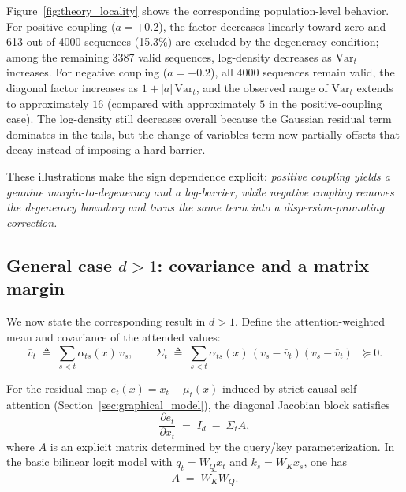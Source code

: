 \documentclass[11pt]{article}
\begin{document}
Figure~\ref{fig:theory_locality} shows the corresponding population-level behavior.
For positive coupling ($a=+0.2$), the factor decreases linearly toward zero and
613 out of 4000 sequences (15.3\%) are excluded by the degeneracy condition; among the remaining
3387 valid sequences, log-density decreases as $\mathrm{Var}_t$ increases.
For negative coupling ($a=-0.2$), all 4000 sequences remain valid, the diagonal factor increases as
$1+|a|\,\mathrm{Var}_t$, and the observed range of $\mathrm{Var}_t$ extends to approximately $16$
(compared with approximately $5$ in the positive-coupling case).
The log-density still decreases overall because the Gaussian residual term dominates in the tails,
but the change-of-variables term now partially offsets that decay instead of imposing a hard barrier.

These illustrations make the sign dependence explicit:
\emph{positive coupling yields a genuine margin-to-degeneracy and a log-barrier, while negative coupling
removes the degeneracy boundary and turns the same term into a dispersion-promoting correction.}

\subsection{General case \texorpdfstring{$d>1$}{d>1}: covariance and a matrix margin}
\label{subsec:matrix_case}

We now state the corresponding result in $d>1$.
Define the attention-weighted mean and covariance of the attended values:
\begin{equation}
\bar v_t \;\triangleq\; \sum_{s<t}\alpha_{ts}(x)\,v_s,
\qquad
\Sigma_t \;\triangleq\; \sum_{s<t}\alpha_{ts}(x)\,(v_s-\bar v_t)(v_s-\bar v_t)^\top \succeq 0.
\label{eq:cov_def_general}
\end{equation}

\begin{theorem}
\label{thm:jacobian_dispersion}
For the residual map $e_t(x)=x_t-\mu_t(x)$ induced by strict-causal self-attention (Section~\ref{sec:graphical_model}), the diagonal Jacobian block satisfies
\begin{equation}
\frac{\partial e_t}{\partial x_t}
\;=\;
I_d \;-\; \Sigma_t A,
\label{eq:matrix_diag_block}
\end{equation}
where $A$ is an explicit matrix determined by the query/key parameterization. In the basic bilinear logit model with $q_t=W_Q x_t$ and $k_s=W_K x_s$, one has
\begin{equation}
A \;=\; W_K^\top W_Q.
\label{eq:A_basic}
\end{equation}
\end{theorem}
\end{document}
